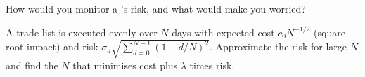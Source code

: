 \begin{interviewq}\label{iq:s1:the-asset-managers-strategies:5}
How would you monitor a 's risk, and what would make you worried?
\end{interviewq}

\begin{interviewq}\label{iq:s1:the-asset-managers-strategies:6}
A trade list is executed evenly over $N$ days with expected cost $c_0 N^{-1/2}$ (square-root impact) and risk $\sigma_a \sqrt{\sum_{d=0}^{N-1}(1 -
d/N)^2}$. Approximate the risk for large $N$ and find the $N$ that minimises cost plus $\lambda$ times risk.
\end{interviewq}
